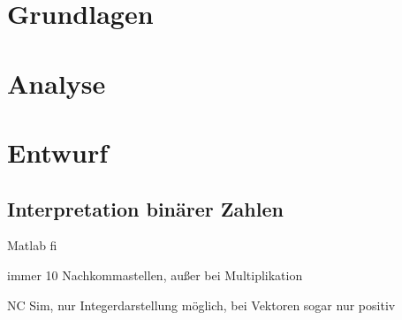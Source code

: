 



 

 \tableofcontents
 
 
 
 
 
 
 
 \chapter{Grundlagen}
 
 
 
 
  
 
 
  
 
 
 
 
 
 
 \chapter{Analyse}
 
 
 
 
 
 

 
 
 
\chapter{Entwurf}

 
\section{Interpretation binärer Zahlen}
 Matlab fi
 
 immer 10 Nachkommastellen, außer bei Multiplikation
 
 NC Sim, nur Integerdarstellung möglich, bei Vektoren sogar nur positiv
 
 
 
 
  
 
 
